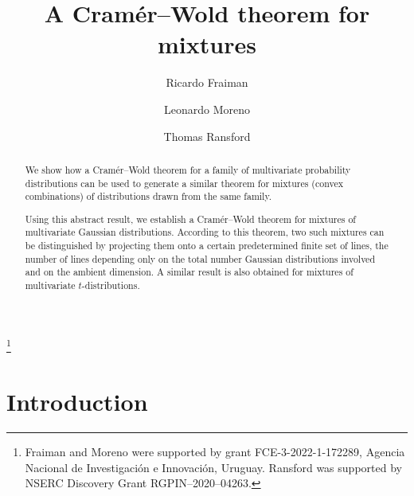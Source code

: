 \documentclass[11pt]{amsart}
\theoremstyle{plain}
\theoremstyle{remark}
\begin{document}
	
\title{A Cram\'er--Wold theorem for mixtures}
	
\author[R. Fraiman]{Ricardo Fraiman}
\address{Centro de Matem\'atica, Facultad de Ciencias, Universidad de la Rep\'ublica, Uruguay.} 
	
\author[L. Moreno]{Leonardo Moreno}
\address{Instituto de Estad\'{i}stica, Departamento de M\'etodos Cuantitativos, FCEA, Universidad de la Rep\'ublica, Uruguay.}
	
\author[T. Ransford]{Thomas Ransford}
\address{D\'epartement de math\'ematiques et de statistique, Universit\'e Laval, Qu\'ebec City (Qu\'ebec),  Canada G1V 0A6.}
	
\thanks{Fraiman and Moreno were   supported by grant FCE-3-2022-1-172289, Ag\-encia Nacional de Investigaci\'on e Innovaci\'on, Uruguay. Ransford  was supported by NSERC Discovery Grant RGPIN--2020--04263.}
	
	
\begin{abstract}
We show how a Cram\'er--Wold  theorem for a family of multivariate probability
distributions  can be used to generate a similar theorem for mixtures (convex combinations)
of distributions drawn from the same family.
		
Using this abstract result, we establish a Cram\'er--Wold theorem for mixtures of multivariate Gaussian distributions.
According to this theorem, two such mixtures can be distinguished by projecting them onto a certain predetermined finite set of lines, the number of lines depending only on the total number Gaussian distributions  involved and on the ambient dimension. A similar result is also obtained for mixtures of multivariate $t$-distributions.
\end{abstract}
	
	
\makeatletter
{}
\makeatother
	
	
\maketitle
	

\section{Introduction}
	
\end{document}
